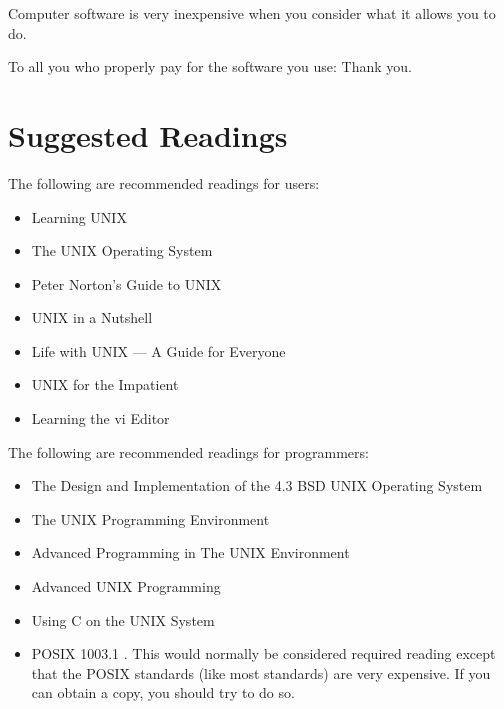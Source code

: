 \documentclass{report}
\begin{document}
Computer software is very inexpensive when you
consider what it allows you to do.
 
To all you who properly pay for the software you use:
Thank you.

\section{Suggested Readings}

The following are recommended readings for users:
\begin{itemize}
\item Learning UNIX \cite{gardner}
\item The UNIX Operating System \cite{christian}
\item Peter Norton's Guide to UNIX \cite{norton}
\item UNIX in a Nutshell \cite{gilly}
\item Life with UNIX --- A Guide for Everyone \cite{libes}
\item UNIX for the Impatient \cite{abrahams}
\item Learning the vi Editor \cite{lamb}
\end{itemize}

The following are recommended readings for programmers:
\begin{itemize}
\item The Design and Implementation of the 4.3 BSD UNIX Operating System \cite{leffler}
\item The UNIX Programming Environment \cite{kern_pike}
\item Advanced Programming in The UNIX Environment \cite{stevens}
\item Advanced UNIX Programming \cite{rochkind}
\item Using C on the UNIX System \cite{curry}
\item POSIX 1003.1 \cite{posix1}.  This would normally be considered
	required reading except that the POSIX standards (like most
	standards) are very expensive.  If you can obtain a copy, you
	should try to do so.
\end{itemize}
\end{document}
